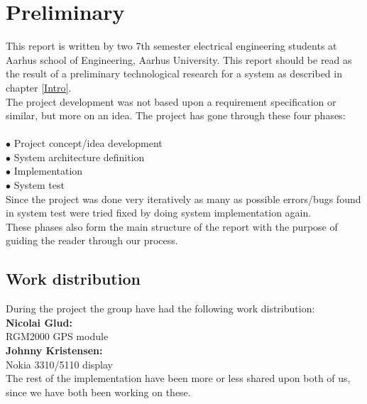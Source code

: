\chapter{Preliminary}

This report is written by two 7th semester electrical engineering students at Aarhus school of Engineering, Aarhus University. This report should be read as the result of a preliminary technological research for a system as described in chapter \ref{Intro}.\\
The project development was not based upon a requirement specification or similar, but more on an idea. The project has gone through these four phases:\\
\\
$\bullet$ Project concept/idea development\\
$\bullet$ System architecture definition\\
$\bullet$ Implementation\\
$\bullet$ System test\\

Since the project was done very iteratively as many as possible errors/bugs found in system test were tried fixed by doing system implementation again.\\
These phases also form the main structure of the report with the purpose of guiding the reader through our process.\\

\section{Work distribution}
During the project the group have had the following work distribution:\\
\textbf{Nicolai Glud:}\\
\hspace*{1cm} RGM2000 GPS module\\
\textbf{Johnny Kristensen:}\\
\hspace*{1cm} Nokia 3310/5110 display\\
The rest of the implementation have been more or less shared upon both of us, since we have both been working on these.